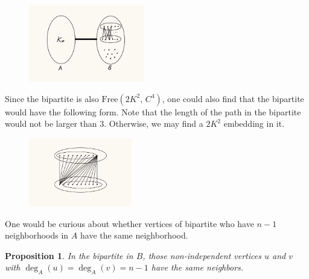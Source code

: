 \documentclass{article}
\newtheorem{prop}{\bf Proposition}
\begin{document}
    \begin{figure}[h!]%
        \centering
        \includegraphics[width=0.45\textwidth]{pic/g4.jpg}
    \end{figure}
    Since the bipartite is also $\text{Free}(2K^2,\, C^4)$, one could also find that the bipartite would have the following form. Note that the length of the path in the bipartite would not be larger than 3. Otherwise, we may find a $2K^2$ embedding in it.
    \begin{figure}[h!]%
        \centering
        \includegraphics[width=0.4\textwidth]{pic/g5.jpg}
    \end{figure}

    One would be curious about whether vertices of bipartite who have $n-1$ neighborhoods in $A$ have the same neighborhood.

    \begin{prop}
        In the bipartite in $B$, those non-independent vertices $u$ and $v$ with $\deg_A(u)=\deg_A(v)=n-1$ have the same neighbors.
    \end{prop}
\end{document}
